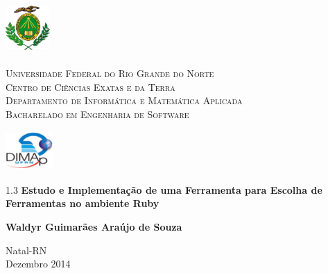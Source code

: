 
\begin{titlepage}
	\begin{center}
		
		\begin{minipage}{2cm}
			\begin{center}
				\includegraphics[width=1.7cm, height=2.0cm]{Imagens/Brasao-UFRN.jpg}
			\end{center}
		\end{minipage}
		\begin{minipage}{11cm}
			\begin{center}
				\begin{espacosimples}
					{\small \textsc{Universidade Federal do Rio Grande do Norte}			\\
							  \textsc{Centro de Ciências Exatas e da Terra}						\\
							  \textsc{Departamento de Informática e Matemática Aplicada}	\\
							  \textsc{Bacharelado em Engenharia de Software}}
				\end{espacosimples}
			\end{center}
		\end{minipage}
		\begin{minipage}{2cm}
			\begin{center}
				\includegraphics[width=1.8cm, height=1.5cm]{Imagens/Logotipo-DIMAp.jpg}
			\end{center}
		\end{minipage}
			
		\vspace{5cm}
						
		{\setlength{\baselineskip}%
		{1.3\baselineskip}
		{\LARGE \textbf{Estudo e Implementação de uma Ferramenta para Escolha de Ferramentas no ambiente Ruby}}\par}
			
		\vspace{4cm}
			
		{\large \textbf{Waldyr Guimarães Araújo de Souza}}
						
		\vspace{7cm}
		
		Natal-RN\\Dezembro 2014
	\end{center}
\end{titlepage}
